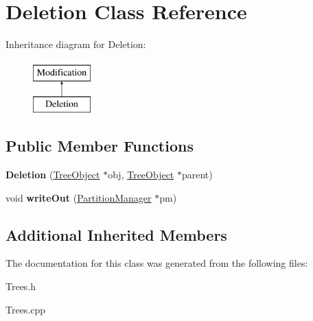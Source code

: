 \hypertarget{classDeletion}{}\section{Deletion Class Reference}
\label{classDeletion}
Inheritance diagram for Deletion\+:\begin{figure}[H]
\begin{center}
\leavevmode
\includegraphics[height=2.000000cm]{classDeletion}
\end{center}
\end{figure}
\subsection*{Public Member Functions}
\begin{DoxyCompactItemize}
\item 
\mbox{\label{classDeletion_a8446318e3f7004ef557b6021350fa389}} 
{\bfseries Deletion} (\mbox{\hyperlink{classTreeObject}{Tree\+Object}} $\ast$obj, \mbox{\hyperlink{classTreeObject}{Tree\+Object}} $\ast$parent)
\item 
\mbox{\label{classDeletion_a6e15b84e08d36dc4239b8cc2c1ae6b94}} 
void {\bfseries write\+Out} (\mbox{\hyperlink{classPartitionManager}{Partition\+Manager}} $\ast$pm)
\end{DoxyCompactItemize}
\subsection*{Additional Inherited Members}


The documentation for this class was generated from the following files\+:\begin{DoxyCompactItemize}
\item 
Trees.\+h\item 
Trees.\+cpp\end{DoxyCompactItemize}
